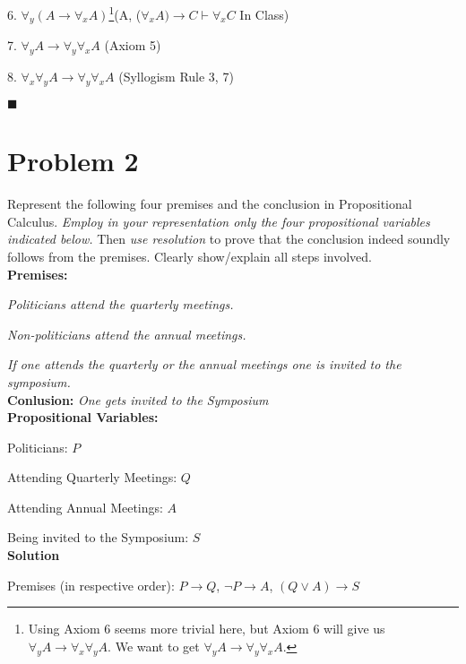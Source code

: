 \documentclass{article}
\newcommand{\solution}{\textbf{\large Solution}}
\newcommand{\tOne}{7.5cm}
\begin{document}
6. $\forall_y(A \rightarrow \forall_xA)$\footnote{Using Axiom 6 seems more trivial here, but Axiom 6 will give us $\forall_yA \rightarrow \forall_x\forall_yA$. We want to get $\forall_yA \rightarrow \forall_y\forall_xA$.}\tabto{\tOne}(A, ($\forall_xA) \rightarrow C \vdash \forall_xC$ In Class)

7. $\forall_yA \rightarrow \forall_y\forall_xA$ \tabto{\tOne}(Axiom 5)

8. $\forall_x\forall_yA \rightarrow \forall_y\forall_xA$ \tabto{\tOne}(Syllogism Rule 3, 7)

$\blacksquare$

\pagebreak


\section*{Problem 2}
Represent the following four premises and the conclusion in Propositional Calculus. \emph{Employ in your representation only the four propositional variables indicated below.} Then \emph{use resolution} to prove that the conclusion indeed soundly follows from the premises. Clearly show/explain all steps involved.\\

\textbf{Premises:}

\emph{Politicians attend the quarterly meetings.}

\emph{Non-politicians attend the annual meetings.}

\emph{If one attends the quarterly or the annual meetings one is invited to the symposium.}\\

\textbf{Conlusion:}\emph{ One gets invited to the Symposium}\\

\textbf{Propositional Variables:}

Politicians: $P$

Attending Quarterly Meetings: $Q$

Attending Annual Meetings: $A$

Being invited to the Symposium: $S$\\

\solution

Premises (in respective order): $P \rightarrow Q$, $\neg{P} \rightarrow A$, $(Q \vee A) \rightarrow S$
\end{document}
